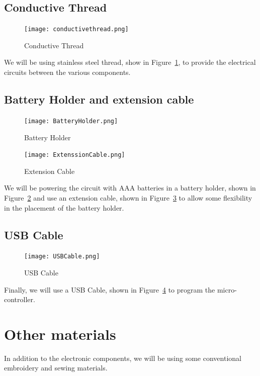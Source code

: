 \documentclass[letterpaper,twoside,12pt]{article}
\begin{document}
\subsection{Conductive Thread}
\begin{figure}[hbpt]\begin{centering}%
\texttt{[image: conductivethread.png]}
\caption{Conductive Thread}
\label{fig:conductivethread}
\end{centering}\end{figure}
We will be using stainless steel thread, show in 
Figure~\ref{fig:conductivethread}, to provide the electrical circuits between 
the various components. 
\clearpage
\subsection{Battery Holder and extension cable}
\begin{figure}[hbpt]\begin{centering}%
\texttt{[image: BatteryHolder.png]}
\caption{Battery Holder}
\label{fig:batteryholder}
\end{centering}\end{figure}
\begin{figure}[hbpt]\begin{centering}%
\texttt{[image: ExtenssionCable.png]}
\caption{Extension Cable}
\label{fig:extenssioncable}
\end{centering}\end{figure}
We will be powering the circuit with AAA batteries in a battery holder, shown 
in Figure~\ref{fig:batteryholder} and use an extension cable, shown in 
Figure~\ref{fig:extenssioncable} to allow some flexibility in the placement of 
the battery holder.
\clearpage
\subsection{USB Cable}
\begin{figure}[hbpt]\begin{centering}%
\texttt{[image: USBCable.png]}
\caption{USB Cable}
\label{fig:usbcable}
\end{centering}\end{figure}
Finally, we will use a USB Cable, shown in Figure~\ref{fig:usbcable} to 
program the micro-controller.
\section{Other materials}
In addition to the electronic components, we will be using some conventional 
embroidery and sewing materials.
\clearpage
\end{document}
